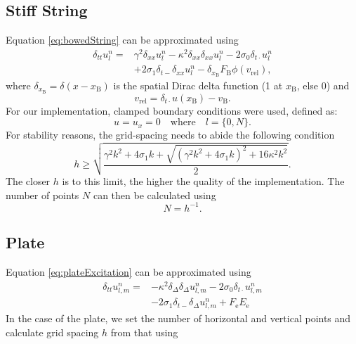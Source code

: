 \documentclass{article}
\begin{document}
\subsection{Stiff String}\label{subsec:stiffStringFDS}
Equation \eqref{eq:bowedString} can be approximated using
\begin{equation}
\begin{aligned}\label{eq:discreteString}
\delta_{tt} u_l^n =&\gamma^2 \delta_{xx} u_l^n -\kappa^2\delta_{xx}\delta_{xx} u_l^n - 2\sigma_0\delta_{t\cdot} u_l^n  \\
&+ 2\sigma_1\delta_{t-}\delta_{xx}u_l^n - \delta_{x_\text{B}}F_\text{B}\phi(v_\text{rel}),
\end{aligned}
\end{equation}
where $\delta_{x_\text{B}} = \delta(x-x_\text{B})$ is the spatial Dirac delta function (1 at $x_\text{B}$, else 0) and 
\begin{equation}\label{eq:descreteRelativeVel}
    v_\text{rel} = \delta_{t\cdot}u(x_\text{B})-v_\text{B}.
\end{equation}
For our implementation, clamped boundary conditions were used, defined as:
\begin{equation}\label{boundary}
    u = u_x = 0 \quad \text{where} \quad l = \{0, N\}.
  \end{equation}
For stability reasons, the grid-spacing needs to abide the following condition
\begin{equation}
    h \geq \sqrt{\frac{\gamma^2 k^2 + 4 \sigma_1 k + \sqrt {(\gamma^2 k^2 + 4 \sigma_1 k)^2 + 16 \kappa^2 k^2}}{2}}.
\end{equation}
The closer $h$ is to this limit, the higher the quality of the implementation. The number of points $N$ can then be calculated using 
\begin{equation}
    N = h^{-1}.
\end{equation}


\subsection{Plate}
  

Equation \eqref{eq:plateExcitation} can be approximated using
\begin{equation}
    \begin{aligned}\label{eq:plateFDS}
     \delta_{tt}u_{l,m}^n = &-\kappa^2 \delta_\Delta\delta_\Delta u_{l,m}^n - 2\sigma_0\delta_{t\cdot}u_{l,m}^n \\
        &- 2\sigma_1\delta_{t−}\delta_\Delta u_{l,m}^n + F_\text{e}E_\text{e}
    \end{aligned}
\end{equation}
In the case of the plate, we set the number of horizontal and vertical points and calculate grid spacing $h$ from that using 
\end{document}
